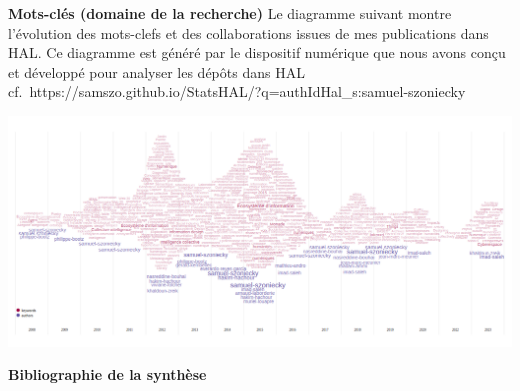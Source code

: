 \documentclass[
  a4paper,
  DIV=11,
  numbers=noendperiod]{scrreprt}
\begin{document}
\textbf{Mots-clés (domaine de la recherche)} Le diagramme suivant montre
l'évolution des mots-clefs et des collaborations issues de mes
publications dans HAL. Ce diagramme est généré par le dispositif
numérique que nous avons conçu et développé pour analyser les dépôts
dans HAL
cf.~https://samszo.github.io/StatsHAL/?q=authIdHal\_s:samuel-szoniecky

\includegraphics{images/samszo.github.io_StatsHALStream.png}

\textbf{Bibliographie de la synthèse}
\end{document}
